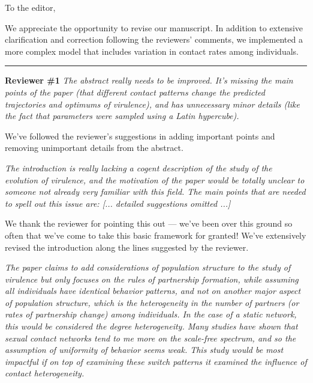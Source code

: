 \documentclass[10pt]{letter}
\newcommand{\revcomment}[1]{\emph{#1}}
\newcommand{\response}[1]{#1}
\begin{document}
\date{\today}

\signature{\texttt{[image: bbsig3.png]}\\Benjamin Bolker}

\begin{letter}{
} 

\opening{To the editor,}

We appreciate the opportunity to revise our manuscript.
In addition to extensive clarification and correction following
the reviewers' comments, we implemented a more complex model
that includes variation in contact rates among individuals.

\hrule

\textbf{Reviewer \#1}
\revcomment{The abstract really needs to be improved. It’s missing the main points
of the paper (that different contact patterns change the predicted
trajectories and optimums of virulence), and has unnecessary minor
details (like the fact that parameters were sampled using a Latin
hypercube).}

\response{We've followed the reviewer's suggestions in adding
important points and removing unimportant details from the abstract.}

\revcomment{The introduction is really lacking a cogent description of the study of
the evolution of virulence, and the motivation of the paper would be
totally unclear to someone not already very familiar with this field.
The main points that are needed to spell out this issue are:
[... detailed suggestions omitted ...]
}

\response{We thank the reviewer for pointing this out --- we've 
been over this ground so often that we've come to take this basic
framework for granted!  We've  extensively revised the introduction
along the lines suggested by the reviewer.}

\revcomment{
The paper claims to add considerations of population structure to the
study of virulence but only focuses on the rules of partnership
formation, while assuming all individuals have identical behavior
patterns, and not on another major aspect of population structure, which
is the heterogeneity in the number of partners (or rates of partnership
change) among individuals. In the case of a static network, this would
be considered the degree heterogeneity. Many studies have shown that
sexual contact networks tend to me more on the scale-free spectrum, and
so the assumption of uniformity of behavior seems weak. This study would
be most impactful if on top of examining these switch patterns it
examined the influence of contact heterogeneity.}


\end{letter}
\end{document}
